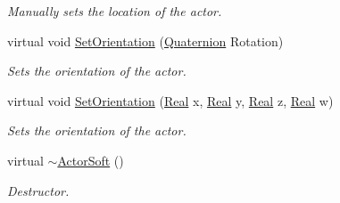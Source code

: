 \begin{DoxyCompactItemize}
\begin{DoxyCompactList}\small\item\em Manually sets the location of the actor. \item\end{DoxyCompactList}\item 
virtual void \hyperlink{classMezzanine_1_1ActorSoft_a3490444768316d69b5560d3500550a4f}{SetOrientation} (\hyperlink{classMezzanine_1_1Quaternion}{Quaternion} Rotation)
\begin{DoxyCompactList}\small\item\em Sets the orientation of the actor. \item\end{DoxyCompactList}\item 
virtual void \hyperlink{classMezzanine_1_1ActorSoft_aa203dd4d6bde54f4551673e2690f20b8}{SetOrientation} (\hyperlink{namespaceMezzanine_a726731b1a7df72bf3583e4a97282c6f6}{Real} x, \hyperlink{namespaceMezzanine_a726731b1a7df72bf3583e4a97282c6f6}{Real} y, \hyperlink{namespaceMezzanine_a726731b1a7df72bf3583e4a97282c6f6}{Real} z, \hyperlink{namespaceMezzanine_a726731b1a7df72bf3583e4a97282c6f6}{Real} w)
\begin{DoxyCompactList}\small\item\em Sets the orientation of the actor. \item\end{DoxyCompactList}\item 
virtual \hyperlink{classMezzanine_1_1ActorSoft_a4701cb3e90164c828247a43ff098f69b}{$\sim$ActorSoft} ()
\begin{DoxyCompactList}\small\item\em Destructor. \item\end{DoxyCompactList}\end{DoxyCompactItemize}
